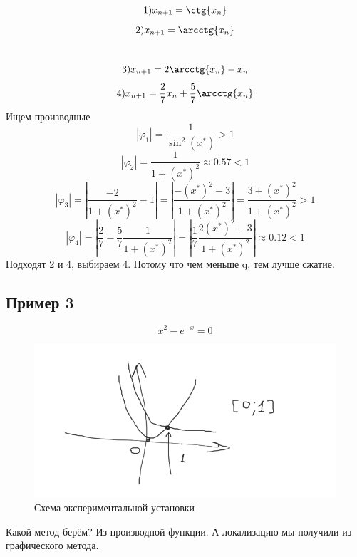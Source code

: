 \documentclass[a4paper,12pt]{article}
\begin{document}
\[1) x_{n+1} = \ctg{x_n}\]
\[2) x_{n+1} = \arcctg{x_n}\]\
\[3) x_{n+1} = 2\arcctg{x_n} - x_n\]
\[4) x_{n+1} = \frac{2}{7}x_n + \frac{5}{7}\arcctg{x_n}\]
Ищем производные\\
\[|\varphi_1| = \frac{1}{\sin^2{(x^*)}} > 1\]
\[|\varphi_2| = \frac{1}{1 + (x^*)^2} \approx 0.57 < 1\]
\[|\varphi_3| = |\frac{-2}{1+(x^*)^2} - 1| = |\frac{-(x^*)^2 - 3}{1 + (x^*)^2}| = \frac{3 + (x^*)^2}{1 + (x^*)^2} > 1 \]
\[|\varphi_4| = |\frac{2}{7} - \frac{5}{7}\frac{1}{1+(x^*)^2}| = |\frac{1}{7}\frac{2(x^*)^2 - 3}{1 + (x^*)^2}| \approx 0.12 < 1\]
Подходят 2 и 4, выбираем 4. Потому что чем меньше q, тем лучше сжатие.

\subsection*{Пример 3}
\[x^2 - e^{-x} = 0\]
        \begin{figure}[h!]
            \centering
            \includegraphics[width=12cm]{5SemPic1.png}
            \caption{Схема экспериментальной установки}
            \label{fig:vac}
        \end{figure}
        
        Какой метод берём?
        Из производной функции. А локализацию мы получили из графического метода.
\end{document}
